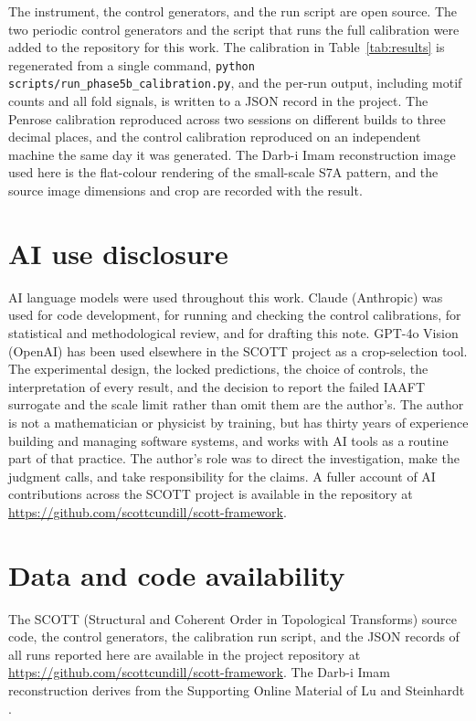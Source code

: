 \documentclass[11pt]{article}
\begin{document}
The instrument, the control generators, and the run script are open source. The
two periodic control generators and the script that runs the full calibration
were added to the repository for this work. The calibration in
Table~\ref{tab:results} is regenerated from a single command,
\texttt{python scripts/run\_phase5b\_calibration.py}, and the per-run output,
including motif counts and all fold signals, is written to a JSON record in the
project. The Penrose calibration reproduced across two sessions on
different builds to three decimal places, and the control calibration reproduced
on an independent machine the same day it was generated. The Darb-i Imam
reconstruction image used here is the flat-colour rendering of the small-scale
S7A pattern, and the source image dimensions and crop are recorded with the
result.

\section{AI use disclosure}

AI language models were used throughout this work. Claude (Anthropic) was used
for code development, for running and checking the control calibrations, for
statistical and methodological review, and for drafting this note. GPT-4o
Vision (OpenAI) has been used elsewhere in the SCOTT project as a crop-selection
tool. The experimental design, the locked predictions, the choice of controls,
the interpretation of every result, and the decision to report the failed IAAFT
surrogate and the scale limit rather than omit them are the author's. The author
is not a mathematician or physicist by training, but has thirty years of
experience building and managing software systems, and works with AI tools as a
routine part of that practice. The author's role was to direct the
investigation, make the judgment calls, and take responsibility for the claims.
A fuller account of AI contributions across the SCOTT project is available in the
repository at \url{https://github.com/scottcundill/scott-framework}.

\section{Data and code availability}

The SCOTT (Structural and Coherent Order in Topological Transforms) source code,
the control generators, the calibration run script, and the JSON records of all
runs reported here are available in the project repository at
\url{https://github.com/scottcundill/scott-framework}. The Darb-i Imam
reconstruction derives from the Supporting Online Material of Lu and Steinhardt
\cite{lu2007}.
\end{document}
